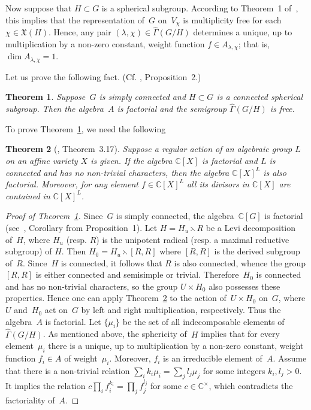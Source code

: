 \documentclass[12pt]{amsart}
\newtheorem{theorem}{Theorem}
\theoremstyle{definition}
\theoremstyle{remark}
\begin{document}
{}{}
\label{ssec1.3} Now suppose that $H\subset G$ is a spherical
subgroup. According to Theorem~1 of~\cite{1}, this implies that the
representation of~$G$ on~$V_{\chi}$ is multiplicity free for each
$\chi\in\mathfrak{X}(H)$. Hence, any pair $(\lambda,\chi)\in
\widehat\Gamma(G/H)$ determines a unique, up to multiplication by a
non-zero constant, weight function $f\in A_{\lambda,\chi}$; that is,
$\dim A_{\lambda,\chi}=1$.

Let us prove the following fact. (Cf. \cite{9}, Proposition~2.)

\begin{theorem}
\label{th1} Suppose~$G$ is simply connected and $H\subset G$ is a
connected spherical subgroup. Then the algebra~$A$ is factorial and
the semigroup $\widehat\Gamma(G/H)$ is free.
\end{theorem}

To prove Theorem~\ref{th1}, we need the following

\begin{theorem}[{\rm \cite{10}, Theorem~3.17}]
\label{th2} Suppose a regular action of an algebraic group $L$ on an
affine variety $X$ is given. If the algebra $\mathbb C[X]$ is
factorial and $L$ is connected and has no non-trivial characters,
then the algebra $\mathbb C[X]^L$ is also factorial. Moreover, for
any element $f\in \mathbb C[X]^L$ all its divisors in $\mathbb C[X]$
are contained in $\mathbb C[X]^L$.
\end{theorem}

\begin{proof}[Proof of Theorem~\ref{th1}]
Since~$G$ is simply connected, the algebra~$\mathbb{C}[G]$ is
factorial (see~\cite{11}, Corollary from Proposition~1). Let
$H=H_u\leftthreetimes R$ be a Levi decomposition of~$H$, where $H_u$
(resp. $R$) is the unipotent radical (resp. a maximal reductive
subgroup) of $H$. Then $H_0=H_u\leftthreetimes [R,R]$ where $[R,R]$
is the derived subgroup of~$R$. Since~$H$ is connected, it follows
that $R$ is also connected, whence the group $[R,R]$ is either
connected and semisimple or trivial. Therefore~$H_0$ is connected
and has no non-trivial characters, so the group $U\times H_0$ also
possesses these properties. Hence one can apply Theorem~\ref{th2} to
the action of~$U\times H_0$ on~$G$, where $U$ and~$H_0$ act on~$G$
by left and right multiplication, respectively. Thus the algebra~$A$
is factorial. Let $\{\mu_i\}$ be the set of all indecomposable
elements of $\widehat\Gamma(G/H)$. As mentioned above, the
sphericity of~$H$ implies that for every element~$\mu_i$ there is a
unique, up to multiplication by a non-zero constant, weight function
$f_i\in A$ of weight~$\mu_i$. Moreover, $f_i$ is an irreducible
element of~$A$. Assume that there is a non-trivial relation
$\sum_ik_i\mu_i=\sum_jl_j\mu_j$ for some integers $k_i,l_j>0$. It
implies the relation $c\prod_i f_i^{k_i}=\prod_j f_j^{l_j}$ for some
$c\in\mathbb{C}^{\times}$, which contradicts the factoriality
of~$A$.
\end{proof}
\end{document}
